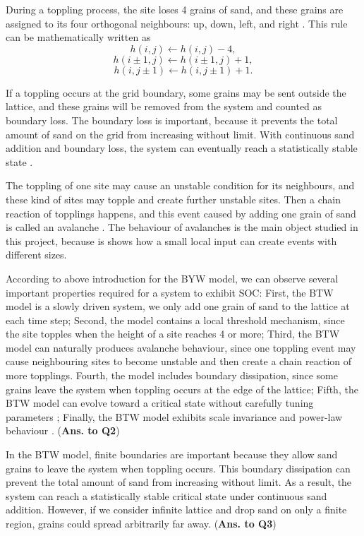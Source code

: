 During a toppling process, the site loses 4 grains of sand, and these grains are assigned to its four orthogonal neighbours: up, down, left, and right \citep{Bak1987}. This rule can be mathematically written as
$$
h(i,j) \leftarrow h(i,j) - 4,
$$
$$
h(i\pm1,j) \leftarrow h(i\pm1,j) + 1,
$$
$$
h(i,j\pm1) \leftarrow h(i,j\pm1) + 1.
$$

If a toppling occurs at the grid boundary, some grains may be sent outside the lattice, and these grains will be removed from the system and counted as boundary loss. The boundary loss is important, because it prevents the total amount of sand on the grid from increasing without limit. With continuous sand addition and boundary loss, the system can eventually reach a statistically stable state \citep{Bak1987} \citep{Watkins2016}. 

The toppling of one site may cause an unstable condition for its neighbours, and these kind of sites may topple and create further unstable sites. Then a chain reaction of topplings happens, and this event caused by adding one grain of sand is called an avalanche \citep{Watkins2016}. The behaviour of avalanches is the main object studied in this project, because is shows how a small local input can create events with different sizes. 

According to above introduction for the BYW model, we can observe several important properties required for a system to exhibit SOC: First, the BTW model is a slowly driven system, we only add one grain of sand to the lattice at each time step; Second, the model contains a local threshold mechanism, since the site topples when the height of a site reaches 4 or more; Third, the BTW model can naturally produces avalanche behaviour, since one toppling event may cause neighbouring sites to become unstable and then create a chain reaction of more topplings. Fourth, the model includes boundary dissipation, since some grains leave the system when toppling occurs at the edge of the lattice; Fifth, the BTW model can evolve toward a critical state without carefully tuning parameters \citep{Bak1987}; Finally, the BTW model exhibits scale invariance and power-law behaviour \citep{Bak1987}. (\textbf{Ans. to Q2})

In the BTW model, finite boundaries are important because they allow sand grains to leave the system when toppling occurs. This boundary dissipation can prevent the total amount of sand from increasing without limit. As a result, the system can reach a statistically stable critical state under continuous sand addition. However, if we consider infinite lattice and drop sand on only a finite region, grains could spread arbitrarily far away. (\textbf{Ans. to Q3})

